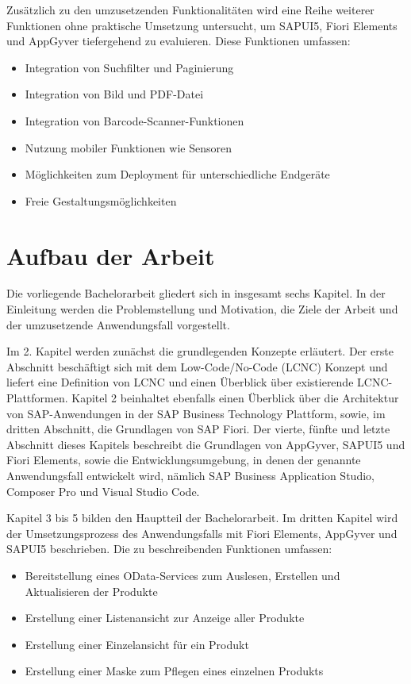 Zusätzlich zu den umzusetzenden Funktionalitäten wird eine Reihe weiterer Funktionen ohne praktische Umsetzung untersucht, um SAPUI5, Fiori Elements und AppGyver tiefergehend zu evaluieren. Diese Funktionen umfassen:
\begin{itemize}[noitemsep]
\item Integration von Suchfilter und Paginierung
\item Integration von Bild und PDF-Datei
\item Integration von Barcode-Scanner-Funktionen
\item Nutzung mobiler Funktionen wie Sensoren
\item Möglichkeiten zum Deployment für unterschiedliche Endgeräte
\item Freie Gestaltungsmöglichkeiten
\end{itemize}

\section{Aufbau der Arbeit}
Die vorliegende Bachelorarbeit gliedert sich in insgesamt sechs Kapitel. In der Einleitung werden die Problemstellung und Motivation, die Ziele der Arbeit und der umzusetzende Anwendungsfall vorgestellt.

Im 2. Kapitel werden zunächst die grundlegenden Konzepte erläutert. Der erste Abschnitt beschäftigt sich mit dem Low-Code/No-Code (LCNC) Konzept und liefert eine Definition von LCNC und einen Überblick über existierende LCNC-Plattformen. Kapitel 2 beinhaltet ebenfalls einen Überblick über die Architektur von SAP-Anwendungen in der SAP Business Technology Plattform, sowie, im dritten Abschnitt, die Grundlagen von SAP Fiori. Der vierte, fünfte und letzte Abschnitt dieses Kapitels beschreibt die Grundlagen von AppGyver, SAPUI5 und Fiori Elements, sowie die Entwicklungsumgebung, in denen der genannte Anwendungsfall entwickelt wird, nämlich SAP Business Application Studio, Composer Pro und Visual Studio Code.

Kapitel 3 bis 5 bilden den Hauptteil der Bachelorarbeit. Im dritten Kapitel wird der Umsetzungsprozess des Anwendungsfalls mit Fiori Elements, AppGyver und SAPUI5 beschrieben. Die zu beschreibenden Funktionen umfassen: 
\begin{itemize}[noitemsep]
\item Bereitstellung eines OData-Services zum Auslesen, Erstellen und Aktualisieren der Produkte
\item Erstellung einer Listenansicht zur Anzeige aller Produkte
\item Erstellung einer Einzelansicht für ein Produkt
\item Erstellung einer Maske zum Pflegen eines einzelnen Produkts
\end{itemize}

